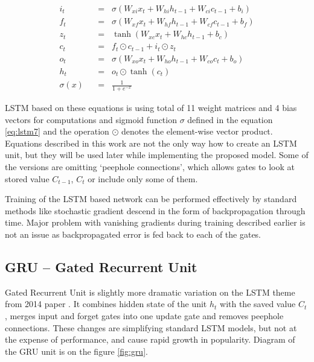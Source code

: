 \belowdisplayskip=24pt
\begin{align}
	i_t \hspace{7pt}&=\hspace{7pt} \sigma(W_{xi}x_t + W_{hi}h_{t-1} + W_{ci}c_{t-1} + b_i) \label{eq:lstm1}\\
	f_t \hspace{7pt}&=\hspace{7pt} \sigma(W_{xf}x_t + W_{hf}h_{t-1} + W_{cf}c_{t-1} + b_f) \label{eq:lstm2}\\
	z_t \hspace{7pt}&=\hspace{7pt} \tanh(W_{xc}x_t + W_{hc}h_{t-1} + b_c) \label{eq:lstm3}\\
	c_t \hspace{7pt}&=\hspace{7pt} f_t\odot c_{t-1} + i_t\odot z_t \label{eq:lstm4}\\
	o_t \hspace{7pt}&=\hspace{7pt} \sigma(W_{xo}x_t + W_{ho}h_{t-1} + W_{co}c_t + b_o) \label{eq:lstm5}\\
	h_t \hspace{7pt}&=\hspace{7pt} o_t\odot \tanh(c_t) \label{eq:lstm6}\\[16pt]
	\sigma(x) \hspace{7pt}&=\hspace{7pt} \frac{1}{1+e^{-x}} \label{eq:lstm7}
\end{align}

LSTM based on these equations is using total of 11 weight matrices and 4 bias vectors for computations and sigmoid function $ \sigma $ defined in the equation \eqref{eq:lstm7} and the operation $ \odot $ denotes the element-wise vector product. Equations described in this work are not the only way how to create an LSTM unit, but they will be used later while implementing the proposed model. Some of the versions are omitting \textquoteleft peephole connections\textquoteright, which allows gates to look at stored value $ C_{t-1} $, $ C_t $ or include only some of them.

Training of the LSTM based network can be performed effectively by standard methods like stochastic gradient descend in the form of backpropagation through time. Major problem with vanishing gradients during training described earlier is not an issue as backpropagated error is fed back to each of the gates.


		\subsection{GRU -- Gated Recurrent Unit}\label{subsec:gru}
Gated Recurrent Unit is slightly more dramatic variation on the LSTM theme from 2014 paper \cite{DBLP:journals/corr/ChoMGBSB14}. It combines hidden state of the unit $ h_t $ with the saved value $ C_t $, merges input and forget gates into one update gate and removes peephole connections. These changes are simplifying standard LSTM models, but not at the expense of performance, and cause rapid growth in popularity. Diagram of the GRU unit is on the figure \ref{fig:gru}.

